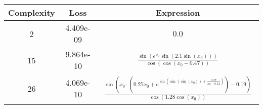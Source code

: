 \begin{center}
        \begin{tabular}{|c|c|c|}
        \hline
        Complexity & Loss & Expression \\
        \hline
        2 & 4.409e-09 & $\begin{aligned}0.0\end{aligned}$\\ \hline15 & 9.864e-10 & $\begin{aligned}\frac{\sin{\left(e^{x_{0}} \sin{\left(2.1 \sin{\left(x_{0} \right)} \right)} \right)}}{\cos{\left(\cos{\left(x_{0} - 0.47 \right)} \right)}}\end{aligned}$\\ \hline26 & 4.069e-10 & $\begin{aligned}\frac{\sin{\left(x_{0} \cdot \left(0.27 x_{0} + e^{\sin{\left(\sin{\left(\sin{\left(x_{0} \right)} \right)} + \frac{0.27}{x_{0} - 0.12} \right)}}\right) - 0.19 \right)}}{\cos{\left(1.28 \cos{\left(x_{0} \right)} \right)}}\end{aligned}$\\ \hline\end{tabular}
        \end{center}
        